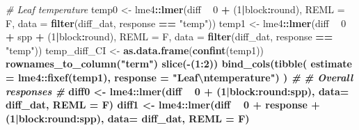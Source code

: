 \documentclass[]{scrartcl}
\newenvironment{Shaded}{\begin{snugshade}}{\end{snugshade}}
\newcommand{\CharTok}[1]{\textcolor[rgb]{0.31,0.60,0.02}{#1}}
\newcommand{\CommentTok}[1]{\textcolor[rgb]{0.56,0.35,0.01}{\textit{#1}}}
\newcommand{\DataTypeTok}[1]{\textcolor[rgb]{0.13,0.29,0.53}{#1}}
\newcommand{\DecValTok}[1]{\textcolor[rgb]{0.00,0.00,0.81}{#1}}
\newcommand{\KeywordTok}[1]{\textcolor[rgb]{0.13,0.29,0.53}{\textbf{#1}}}
\newcommand{\NormalTok}[1]{#1}
\newcommand{\OperatorTok}[1]{\textcolor[rgb]{0.81,0.36,0.00}{\textbf{#1}}}
\newcommand{\StringTok}[1]{\textcolor[rgb]{0.31,0.60,0.02}{#1}}
\begin{document}
\begin{Shaded}
\begin{Highlighting}[]
{{{{{{{{{  \CommentTok{# Leaf temperature}
\NormalTok{    temp0 <-}\StringTok{ }\NormalTok{lme4}\OperatorTok{::}\KeywordTok{lmer}\NormalTok{(diff }\OperatorTok{~}\StringTok{ }\DecValTok{0} \OperatorTok{+}\StringTok{ }\NormalTok{(}\DecValTok{1}\OperatorTok{|}\NormalTok{block}\OperatorTok{:}\NormalTok{round), }\DataTypeTok{REML =}\NormalTok{ F,}
                         \DataTypeTok{data =} \KeywordTok{filter}\NormalTok{(diff_dat, response }\OperatorTok{==}\StringTok{ "temp"}\NormalTok{)) }
\NormalTok{    temp1 <-}\StringTok{ }\NormalTok{lme4}\OperatorTok{::}\KeywordTok{lmer}\NormalTok{(diff }\OperatorTok{~}\StringTok{ }\DecValTok{0} \OperatorTok{+}\StringTok{ }\NormalTok{spp }\OperatorTok{+}\StringTok{ }\NormalTok{(}\DecValTok{1}\OperatorTok{|}\NormalTok{block}\OperatorTok{:}\NormalTok{round), }\DataTypeTok{REML =}\NormalTok{ F,}
                         \DataTypeTok{data =} \KeywordTok{filter}\NormalTok{(diff_dat, response }\OperatorTok{==}\StringTok{ "temp"}\NormalTok{)) }
\NormalTok{    temp_diff_CI <-}\StringTok{ }\KeywordTok{as.data.frame}\NormalTok{(}\KeywordTok{confint}\NormalTok{(temp1)) }\OperatorTok{%
\StringTok{      }\KeywordTok{rownames_to_column}\NormalTok{(}\StringTok{"term"}\NormalTok{) }\OperatorTok{%
\StringTok{      }\KeywordTok{slice}\NormalTok{(}\OperatorTok{-}\NormalTok{(}\DecValTok{1}\OperatorTok{:}\DecValTok{2}\NormalTok{)) }\OperatorTok{%
\StringTok{      }\KeywordTok{bind_cols}\NormalTok{(}\KeywordTok{tibble}\NormalTok{(}
        \DataTypeTok{estimate =}\NormalTok{ lme4}\OperatorTok{::}\KeywordTok{fixef}\NormalTok{(temp1), }
        \DataTypeTok{response =} \StringTok{"Leaf}\CharTok{\textbackslash{}n}\StringTok{temperature"}\NormalTok{) ) }
\CommentTok{#}
\CommentTok{# Overall responses}
\CommentTok{#}
\NormalTok{    diff0 <-}\StringTok{ }\NormalTok{lme4}\OperatorTok{::}\KeywordTok{lmer}\NormalTok{(diff }\OperatorTok{~}\StringTok{ }\DecValTok{0} \OperatorTok{+}\StringTok{ }\NormalTok{(}\DecValTok{1}\OperatorTok{|}\NormalTok{block}\OperatorTok{:}\NormalTok{round}\OperatorTok{:}\NormalTok{spp), }
                        \DataTypeTok{data=}\NormalTok{ diff_dat, }\DataTypeTok{REML =}\NormalTok{ F) }
\NormalTok{    diff1 <-}\StringTok{ }\NormalTok{lme4}\OperatorTok{::}\KeywordTok{lmer}\NormalTok{(diff }\OperatorTok{~}\StringTok{ }\DecValTok{0} \OperatorTok{+}\StringTok{ }\NormalTok{response }\OperatorTok{+}\StringTok{ }\NormalTok{(}\DecValTok{1}\OperatorTok{|}\NormalTok{block}\OperatorTok{:}\NormalTok{round}\OperatorTok{:}\NormalTok{spp), }
                        \DataTypeTok{data=}\NormalTok{ diff_dat, }\DataTypeTok{REML =}\NormalTok{ F) }
}}}}}}}}}}}}
\end{Highlighting}
\end{Shaded}
\end{document}
